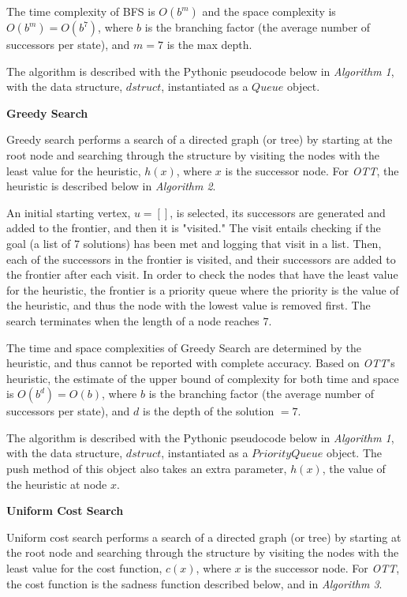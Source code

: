 \documentclass[11pt]{article}
\begin{document}
The time complexity of BFS is $O(b^m)$ and the space complexity is $O(b^m)=O(b^7)$, where $b$ is the branching factor (the average number of successors per state), and $m=7$ is the max depth.

The algorithm is described with the Pythonic pseudocode below in \emph{Algorithm 1}, with the data structure, $dstruct$, instantiated as a $Queue$ object. 

\medskip

\textbf{Greedy Search}

Greedy search performs a search of a directed graph (or tree) by starting at the root node and searching through the structure by visiting the nodes with the least value for the heuristic, $h(x)$, where $x$ is the successor node. For \emph{OTT}, the heuristic is described below in \emph{Algorithm 2}.

An initial starting vertex, $u = []$, is selected, its successors are generated and added to the frontier, and then it is "visited." The visit entails checking if the goal (a list of 7 solutions) has been met and logging that visit in a list. Then, each of the successors in the frontier is visited, and their successors are added to the frontier after each visit. In order to check the nodes that have the least value for the heuristic, the frontier is a priority queue where the priority is the value of the heuristic, and thus the node with the lowest value is removed first. The search terminates when the length of a node reaches $7$.

The time and space complexities of Greedy Search are determined by the heuristic, and thus cannot be reported with complete accuracy. Based on \emph{OTT}'s heuristic, the estimate of the upper bound of complexity for both time and space is $O(b^d) = O(b)$, where $b$ is the branching factor (the average number of successors per state), and $d$ is the depth of the solution $=7$.

The algorithm is described with the Pythonic pseudocode below in \emph{Algorithm 1}, with the data structure, $dstruct$, instantiated as a $PriorityQueue$ object. The push method of this object also takes an extra parameter, $h(x)$, the value of the heuristic at node $x$.

\medskip

\textbf{Uniform Cost Search}

Uniform cost search performs a search of a directed graph (or tree) by starting at the root node and searching through the structure by visiting the nodes with the least value for the cost function, $c(x)$, where $x$ is the successor node. For \emph{OTT}, the cost function is the sadness function described below, and in \emph{Algorithm 3}.
\end{document}
